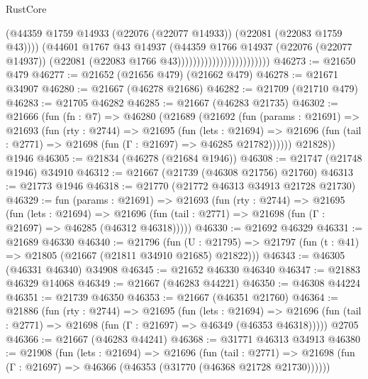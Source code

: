 \begin{lexlean}{RustCore}
\begin{coremodule}
                                              (@44359
                                                @1759
                                                @14933
                                                (@22076 (@22077 @14933))
                                                (@22081 (@22083 @1759 @43))))
                                            (@44601
                                              @1767
                                              @43
                                              @14937
                                              (@44359
                                                @1766
                                                @14937
                                                (@22076 (@22077 @14937))
                                                (@22081 (@22083 @1766 @43))))))))))))))))))))))))
@46273 := @21650 @479
@46277 := @21652 (@21656 @479) (@21662 @479)
@46278 := @21671 @34907
@46280 := @21667 (@46278 @21686)
@46282 := @21709 (@21710 @479)
@46283 := @21705 @46282
@46285 := @21667 (@46283 @21735)
@46302 := @21666
    (fun (fn : @7) =>
    @46280
      (@21689
        (@21692
          (fun (params : @21691) =>
          @21693
            (fun (rty : @2744) =>
            @21695
              (fun (lets : @21694) =>
              @21696 (fun (tail : @2771) => @21698 (fun (Γ : @21697) => @46285 @21782))))))
        @21828))
    @1946
@46305 := @21834 (@46278 (@21684 @1946))
@46308 := @21747 (@21748 @1946) @34910
@46312 := @21667 (@21739 (@46308 @21756) @21760)
@46313 := @21773 @1946
@46318 := @21770 (@21772 @46313 @34913 @21728 @21730)
@46329 := fun (params : @21691) =>
  @21693
    (fun (rty : @2744) =>
    @21695
      (fun (lets : @21694) =>
      @21696 (fun (tail : @2771) => @21698 (fun (Γ : @21697) => @46285 (@46312 @46318)))))
@46330 := @21692 @46329
@46331 := @21689 @46330
@46340 := @21796
    (fun (U : @21795) => @21797 (fun (t : @41) => @21805 (@21667 (@21811 @34910 @21685) @21822)))
@46343 := @46305 (@46331 @46340) @34908
@46345 := @21652 @46330 @46340
@46347 := @21883 @46329 @14068
@46349 := @21667 (@46283 @44221)
@46350 := @46308 @44224
@46351 := @21739 @46350
@46353 := @21667 (@46351 @21760)
@46364 := @21886
    (fun (rty : @2744) =>
    @21695
      (fun (lets : @21694) =>
      @21696 (fun (tail : @2771) => @21698 (fun (Γ : @21697) => @46349 (@46353 @46318)))))
    @2705
@46366 := @21667 (@46283 @44241)
@46368 := @31771 @46313 @34913
@46380 := @21908
    (fun (lets : @21694) =>
    @21696
      (fun (tail : @2771) =>
      @21698 (fun (Γ : @21697) => @46366 (@46353 (@31770 (@46368 @21728 @21730))))))

\end{coremodule}
\end{lexlean}
